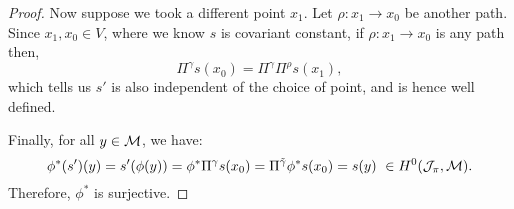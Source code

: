 \begin{proof}
		Now suppose we took a different point $x_1$. Let $\rho:x_1\to x_0$ be another path. Since $x_1,x_0 \in V$, where we know $s$ is covariant constant, if $\rho:x_1\to x_0$ is any path then,
		\begin{equation}
		\Pi^{\gamma}s(x_0) = \Pi^{\gamma}\Pi^{\rho}s(x_1),
		\end{equation}
		which tells us $s'$ is also independent of the choice of point, and is hence well defined. 
		\smallskip
		
		Finally, for all $y\in \mathcal{M}$, we have:
		\begin{equation}
			\phi^\ast (s') (y) = s'(\phi(y)) = \phi^\ast \Pi^{\gamma} s(x_0) =  \Pi^{\tilde{\gamma}} \phi^\ast s(x_0) = s(y) ~ \in H^0(\mathcal{J}_\pi,\mathcal{M}).
		\end{equation}
		Therefore, $\phi^\ast$ is surjective.
		\end{proof}
